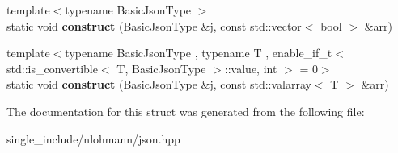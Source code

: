\begin{DoxyCompactItemize}
\mbox{\label{structnlohmann_1_1detail_1_1external__constructor_3_01value__t_1_1array_01_4_a4ebb19b1cb84b4cb224a4c5322e16f14}} 
{\footnotesize template$<$typename Basic\+Json\+Type $>$ }\\static void {\bfseries construct} (Basic\+Json\+Type \&j, const std\+::vector$<$ bool $>$ \&arr)
\item 
\mbox{\label{structnlohmann_1_1detail_1_1external__constructor_3_01value__t_1_1array_01_4_a1b9226304e6492141080b4ebf228ddac}} 
{\footnotesize template$<$typename Basic\+Json\+Type , typename T , enable\+\_\+if\+\_\+t$<$ std\+::is\+\_\+convertible$<$ T, Basic\+Json\+Type $>$\+::value, int $>$  = 0$>$ }\\static void {\bfseries construct} (Basic\+Json\+Type \&j, const std\+::valarray$<$ T $>$ \&arr)
\end{DoxyCompactItemize}


The documentation for this struct was generated from the following file\+:\begin{DoxyCompactItemize}
\item 
single\+\_\+include/nlohmann/json.\+hpp\end{DoxyCompactItemize}
